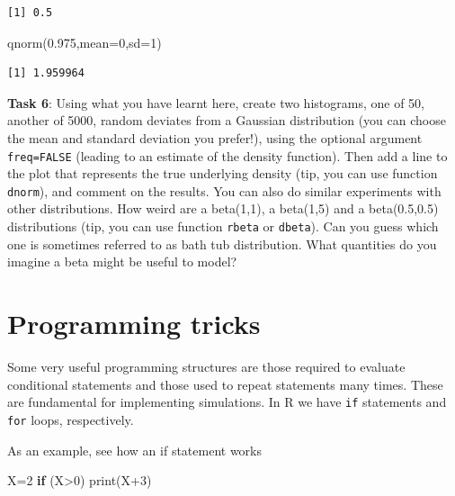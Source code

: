 \documentclass[
  letterpaper,
  DIV=11,
  numbers=noendperiod]{scrartcl}
\newenvironment{Shaded}{\begin{snugshade}}{\end{snugshade}}
\newcommand{\AttributeTok}[1]{\textcolor[rgb]{0.40,0.45,0.13}{#1}}
\newcommand{\ControlFlowTok}[1]{\textcolor[rgb]{0.00,0.23,0.31}{\textbf{#1}}}
\newcommand{\DecValTok}[1]{\textcolor[rgb]{0.68,0.00,0.00}{#1}}
\newcommand{\FloatTok}[1]{\textcolor[rgb]{0.68,0.00,0.00}{#1}}
\newcommand{\FunctionTok}[1]{\textcolor[rgb]{0.28,0.35,0.67}{#1}}
\newcommand{\NormalTok}[1]{\textcolor[rgb]{0.00,0.23,0.31}{#1}}
\newcommand{\OtherTok}[1]{\textcolor[rgb]{0.00,0.23,0.31}{#1}}
\newcommand{\SpecialCharTok}[1]{\textcolor[rgb]{0.37,0.37,0.37}{#1}}
\begin{document}
\begin{verbatim}
[1] 0.5
\end{verbatim}

\begin{Shaded}
\begin{Highlighting}[]
\FunctionTok{qnorm}\NormalTok{(}\FloatTok{0.975}\NormalTok{,}\AttributeTok{mean=}\DecValTok{0}\NormalTok{,}\AttributeTok{sd=}\DecValTok{1}\NormalTok{)}
\end{Highlighting}
\end{Shaded}

\begin{verbatim}
[1] 1.959964
\end{verbatim}

\textbf{Task 6}: Using what you have learnt here, create two histograms,
one of 50, another of 5000, random deviates from a Gaussian distribution
(you can choose the mean and standard deviation you prefer!), using the
optional argument \texttt{freq=FALSE} (leading to an estimate of the
density function). Then add a line to the plot that represents the true
underlying density (tip, you can use function \texttt{dnorm}), and
comment on the results. You can also do similar experiments with other
distributions. How weird are a beta(1,1), a beta(1,5) and a
beta(0.5,0.5) distributions (tip, you can use function \texttt{rbeta} or
\texttt{dbeta}). Can you guess which one is sometimes referred to as
bath tub distribution. What quantities do you imagine a beta might be
useful to model?

\section{Programming tricks}\label{programming-tricks}

Some very useful programming structures are those required to evaluate
conditional statements and those used to repeat statements many times.
These are fundamental for implementing simulations. In R we have
\texttt{if} statements and \texttt{for} loops, respectively.

As an example, see how an if statement works

\begin{Shaded}
\begin{Highlighting}[]
\NormalTok{X}\OtherTok{=}\DecValTok{2}
\ControlFlowTok{if}\NormalTok{ (X}\SpecialCharTok{\textgreater{}}\DecValTok{0}\NormalTok{) }\FunctionTok{print}\NormalTok{(X}\SpecialCharTok{+}\DecValTok{3}\NormalTok{)}
\end{Highlighting}
\end{Shaded}
\end{document}
